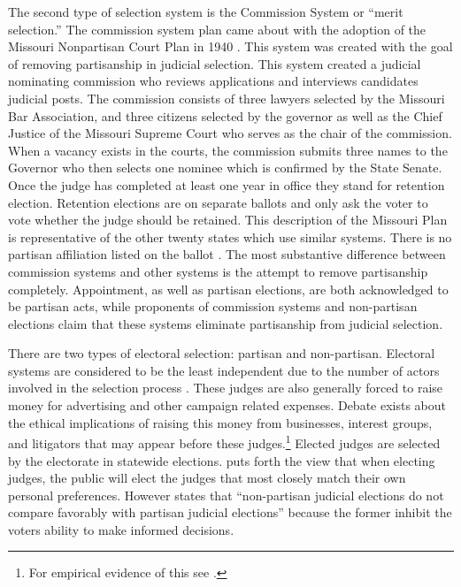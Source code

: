 \documentclass[12pt]{article}
\begin{document}
The second type of selection system is the Commission System or “merit selection.” The commission system plan came about with the adoption of the Missouri Nonpartisan Court Plan in 1940 \citep{Watson1969}. This system was created with the goal of removing partisanship in judicial selection. This system created a judicial nominating commission who reviews applications and interviews candidates judicial posts. The commission consists of three lawyers selected by the Missouri Bar Association, and three citizens selected by the governor as well as the Chief Justice of the Missouri Supreme Court who serves as the chair of the commission. When a vacancy exists in the courts, the commission submits three names to the Governor who then selects one nominee which is confirmed by the State Senate. Once the judge has completed at least one year in office they stand for retention election. Retention elections are on separate ballots and only ask the voter to vote whether the judge should be retained. This description of the Missouri Plan is representative of the other twenty states which use similar systems.  There is no partisan affiliation listed on the ballot \citep{Watson1969}.  The most substantive difference between commission systems and other systems is the attempt to remove partisanship completely. Appointment, as well as partisan elections, are both acknowledged to be partisan acts, while proponents of commission systems and non-partisan elections claim that these systems eliminate partisanship from judicial selection. 

There are two types of electoral selection: partisan and non-partisan.  Electoral systems are considered to be the least independent due to the number of actors involved in the selection process \citep{Choi2010}. These judges are also generally forced to raise money for advertising and other campaign related expenses.  Debate exists about the ethical implications of raising this money from businesses, interest groups, and litigators that may appear before these judges.\footnote{For empirical evidence of this see \citep{Gibson2008}.}  Elected judges are selected by the electorate in statewide elections.  \citet{Caldarone2009} puts forth the view that when electing judges, the public will elect the judges that most closely match their own personal preferences.  However \citet{Debow2013} states that ``non-partisan judicial elections do not compare favorably with partisan judicial elections'' because the former inhibit the voters ability to make informed decisions.
\end{document}
